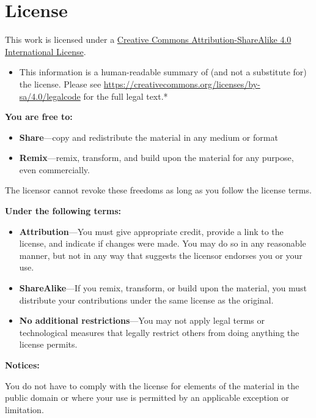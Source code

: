 \documentclass[
]{book}
\providecommand{\tightlist}{%
  \setlength{\itemsep}{0pt}\setlength{\parskip}{0pt}}
\begin{document}
\hypertarget{license}{%
\chapter*{License}\label{license}}

This work is licensed under a \href{https://creativecommons.org/licenses/by-sa/4.0/}{Creative Commons Attribution-ShareAlike 4.0 International License}.

\begin{itemize}
\tightlist
\item
  This information is a human-readable summary of (and not a substitute for) the license.
  Please see \url{https://creativecommons.org/licenses/by-sa/4.0/legalcode} for the full legal text.*
\end{itemize}

\textbf{You are free to:}

\begin{itemize}
\item
  \textbf{Share}---copy and redistribute the material in any medium or
  format
\item
  \textbf{Remix}---remix, transform, and build upon the material for any
  purpose, even commercially.
\end{itemize}

The licensor cannot revoke these freedoms as long as you follow the
license terms.

\textbf{Under the following terms:}

\begin{itemize}
\item
  \textbf{Attribution}---You must give appropriate credit, provide a link
  to the license, and indicate if changes were made. You may do so in
  any reasonable manner, but not in any way that suggests the licensor
  endorses you or your use.
\item
  \textbf{ShareAlike}---If you remix, transform, or build upon the material, you must distribute your contributions under the same license as the original.
\item
  \textbf{No additional restrictions}---You may not apply legal terms or
  technological measures that legally restrict others from doing
  anything the license permits.
\end{itemize}

\textbf{Notices:}

You do not have to comply with the license for elements of the
material in the public domain or where your use is permitted by an
applicable exception or limitation.
\end{document}
